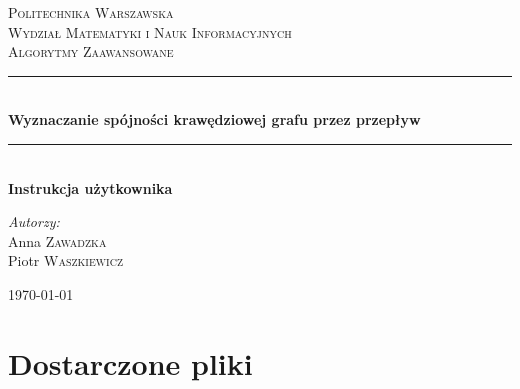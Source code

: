 \documentclass{article}
\begin{document}
	
\begin{titlepage}

\newcommand{\HRule}{\rule{\linewidth}{0.5mm}}

\center


\textsc{\LARGE Politechnika Warszawska}\\[5mm]
\textsc{\LARGE Wydział Matematyki i Nauk Informacyjnych}\\[4cm]
 

\textsc{\Huge Algorytmy Zaawansowane}\\[0.5cm]


\HRule \\[0.4cm]
{ \LARGE \bfseries Wyznaczanie spójności krawędziowej grafu przez przepływ}\\[0.2cm]
 

\HRule \\[0.4cm]
{  \bfseries Instrukcja użytkownika}\\[2.5cm]
 

\begin{flushright}
\Large \emph{Autorzy:}\\[0.5cm]
Anna \textsc{Zawadzka}\\
Piotr \textsc{Waszkiewicz}\\[3.5cm]
\end{flushright}

\vfill
{\large \today}\\[3cm]

\end{titlepage}
	
\newpage

\section{Dostarczone pliki}
\end{document}
